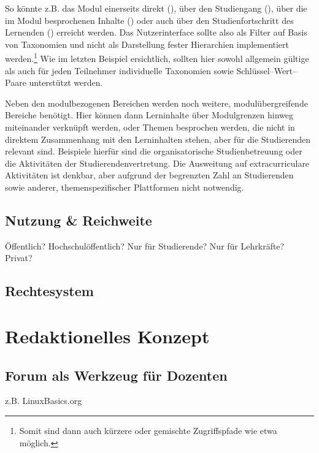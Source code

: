 So könnte z.B. das Modul  einerseits direkt (), über den Studiengang (), über die im Modul besprochenen Inhalte () oder auch über den Studienfortschritt des Lernenden () erreicht werden. Das Nutzerinterface sollte also als Filter auf Basis von Taxonomien und nicht als Darstellung fester Hierarchien implementiert werden.\footnote{Somit sind dann auch kürzere oder gemischte Zugriffspfade wie etwa  möglich.} Wie im letzten Beispiel ersichtlich, sollten hier sowohl allgemein gültige als auch für jeden Teilnehmer individuelle Taxonomien sowie Schlüssel–Wert–Paare unterstützt werden.

Neben den modulbezogenen Bereichen werden noch weitere, modulübergreifende Bereiche benötigt. Hier können dann Lerninhalte über Modulgrenzen hinweg miteinander verknüpft werden, oder Themen besprochen werden, die nicht in direktem Zusammenhang mit den Lerninhalten stehen, aber für die Studierenden relevant sind. Beispiele hierfür sind die organisatorische Studienbetreuung oder die Aktivitäten der Studierendenvertretung. Die Ausweitung auf extracurriculare Aktivitäten ist denkbar, aber aufgrund der begrenzten Zahl an Studierenden sowie anderer, themenspezifischer Plattformen nicht notwendig.

\subsection{Nutzung \& Reichweite} %
\label{sub:reichweite}
Öffentlich? Hochschulöffentlich? Nur für Studierende? Nur für Lehrkräfte? Privat?

\subsection{Rechtesystem} %
\label{sub:rechtesystem}


\section{Redaktionelles Konzept} %
\label{sec:redaktionelles_konzept}
\subsection{Forum als Werkzeug für Dozenten} %
\label{sub:forum_als_werkzeug_fur_dozenten}
z.B. LinuxBasics.org

